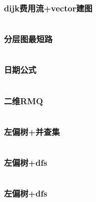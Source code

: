 \documentclass[a4paper,12pt]{article}
\begin{document}
\subsubsection{dijk费用流+vector建图}
\inputminted[]{c++}{code/hdu6611.cpp}
\subsubsection{分层图最短路}
\inputminted[]{c++}{code/bzoj2763.cpp}
\subsubsection{日期公式}
\inputminted[]{c++}{code/nc886G.cpp}
\subsubsection{二维RMQ}
\inputminted[]{c++}{code/2dRMQ.cpp}
\subsubsection{左偏树+并查集}
\inputminted[]{c++}{code/luoguP3377.cpp}
\subsubsection{左偏树+dfs}
\inputminted[]{c++}{code/luoguP1552.cpp}
\subsubsection{左偏树+dfs}
\inputminted[]{c++}{code/luoguP3261.cpp}



\end{document}
